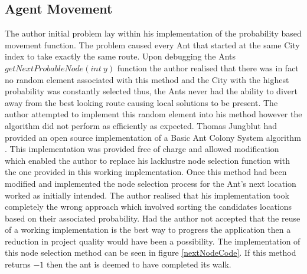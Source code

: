 \subsection{Agent Movement}
\label{antyMove}
The author initial problem lay within his implementation of the probability based movement function. The problem caused every Ant that started at the same City index to take exactly the same route. Upon debugging the Ants $getNextProbableNode(int\ y)$ function the author realised that there was in fact no random element associated with this method and the City with the highest probability was constantly selected thus, the Ants never had the ability to divert away from the best looking route causing local solutions to be present. The author attempted to implement this random element into his method however the algorithm did not perform as efficiently as expected. Thomas Jungblut had provided an open source implementation of a Basic Ant Colony System algorithm \cite{tjung:aco:blog}. This implementation was provided free of charge and allowed modification which enabled the author to replace his lacklustre node selection function with the one provided in this working implementation. Once this method had been modified and implemented the node selection process for the Ant's next location worked as initially intended. The author realised that his implementation took completely the wrong approach which involved sorting the candidates locations based on their associated probability. Had the author not accepted that the reuse of a working implementation is the best way to progress the application then a reduction in project quality would have been a possibility. The implementation of this node selection method can be seen in figure \ref{nextNodeCode}. If this method returns $-1$ then the ant is deemed to have completed its walk.

